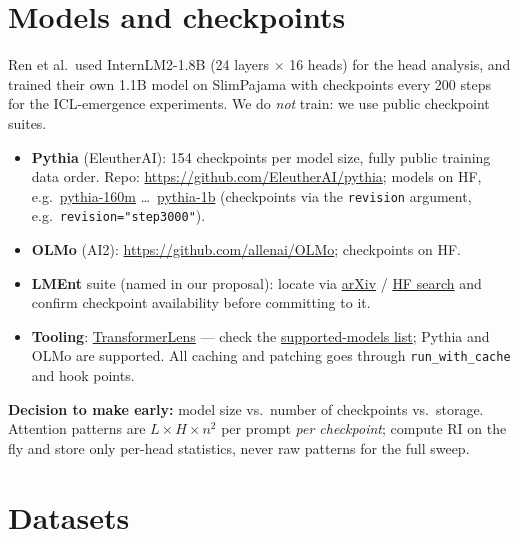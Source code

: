 \documentclass[11pt]{article}
\begin{document}
\section{Models and checkpoints}
Ren et al.\ used InternLM2-1.8B (24 layers $\times$ 16 heads) for the head analysis, and trained their own 1.1B model on SlimPajama with checkpoints every 200 steps for the ICL-emergence experiments. We do \emph{not} train: we use public checkpoint suites.
\begin{itemize}[itemsep=2pt]
  \item \textbf{Pythia} (EleutherAI): 154 checkpoints per model size, fully public training data order. Repo: \url{https://github.com/EleutherAI/pythia}; models on HF, e.g.\ \href{https://huggingface.co/EleutherAI/pythia-160m}{pythia-160m} \dots\ \href{https://huggingface.co/EleutherAI/pythia-1b}{pythia-1b} (checkpoints via the \texttt{revision} argument, e.g.\ \texttt{revision="step3000"}).
  \item \textbf{OLMo} (AI2): \url{https://github.com/allenai/OLMo}; checkpoints on HF.
  \item \textbf{LMEnt} suite (named in our proposal): locate via \href{https://arxiv.org/list/cs.CL/recent}{arXiv} / \href{https://huggingface.co/models?search=lment}{HF search} and confirm checkpoint availability before committing to it.
  \item \textbf{Tooling}: \href{https://github.com/TransformerLensOrg/TransformerLens}{TransformerLens} --- check the \href{https://transformerlensorg.github.io/TransformerLens/}{supported-models list}; Pythia and OLMo are supported. All caching and patching goes through \texttt{run\_with\_cache} and hook points.
\end{itemize}
\textbf{Decision to make early:} model size vs.\ number of checkpoints vs.\ storage. Attention patterns are $L \times H \times n^2$ per prompt \emph{per checkpoint}; compute RI on the fly and store only per-head statistics, never raw patterns for the full sweep.

\section{Datasets}
\end{document}
